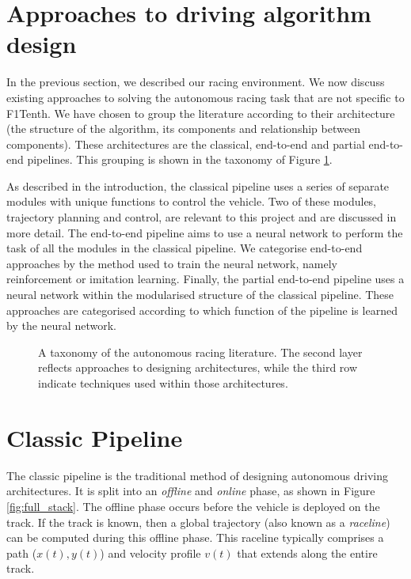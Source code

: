 \section{Approaches to driving algorithm design}
\label{sec:driving_algorithms}
In the previous section, we described our racing environment.
We now discuss existing approaches to solving the autonomous racing task that are not specific to F1Tenth.
We have chosen to group the literature according to their architecture (the structure of the algorithm, its components and relationship between components).
These architectures are the classical, end-to-end and partial end-to-end pipelines.
This grouping is shown in the taxonomy of Figure \ref{fig:lit_tax_sec}. 

As described in the introduction, the classical pipeline uses a series of separate modules with unique functions to control the vehicle.
Two of these modules, trajectory planning and control, are relevant to this project and are discussed in more detail.
The end-to-end pipeline aims to use a neural network to perform the task of all the modules in the classical pipeline.
We categorise end-to-end approaches by the method used to train the neural network, namely reinforcement or imitation learning.
Finally, the partial end-to-end pipeline uses a neural network within the modularised structure of the classical pipeline. 
These approaches are categorised according to which function of the pipeline is learned by the neural network. 

\begin{figure}[htb!]
    \centering
    
    \caption[A taxonomy of the autonomous racing literature with sections]{A taxonomy of the autonomous racing literature. The second layer reflects approaches to designing architectures, while the third row indicate techniques used within those architectures.}
    \label{fig:lit_tax_sec}
\end{figure}


\section{Classic Pipeline}
\label{sec:classic}

The classic pipeline is the traditional method of designing autonomous driving architectures.
It is split into an \emph{offline} and \emph{online} phase, as shown in Figure \ref{fig:full_stack}.
The offline phase occurs before the vehicle is deployed on the track.
If the track is known, then a global trajectory (also known as a \emph{raceline}) can be computed during this offline phase.
This raceline typically comprises a path ($x(t), y(t)$) and velocity profile $v(t)$ that extends along the entire track.

